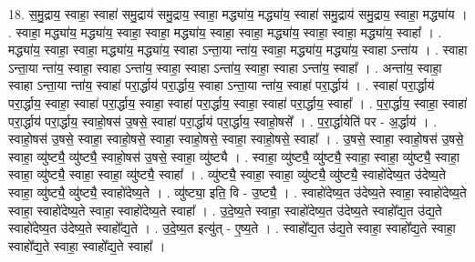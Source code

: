 \documentclass[17pt]{extarticle}
\begin{document}
18. स॒मु॒द्राय॒ स्वाहा॒ स्वाहा॑ समु॒द्राय॑ समु॒द्राय॒ स्वाहा॒ मद्ध्या॑य॒ मद्ध्या॑य॒ स्वाहा॑ समु॒द्राय॑ समु॒द्राय॒ स्वाहा॒ मद्ध्या॑य । . स्वाहा॒ मद्ध्या॑य॒ मद्ध्या॑य॒ स्वाहा॒ स्वाहा॒ मद्ध्या॑य॒ स्वाहा॒ स्वाहा॒ मद्ध्या॑य॒ स्वाहा॒ स्वाहा॒ मद्ध्या॑य॒ स्वाहा᳚ । . मद्ध्या॑य॒ स्वाहा॒ स्वाहा॒ मद्ध्या॑य॒ मद्ध्या॑य॒ स्वाहा ऽन्ता॒या न्ता॑य॒ स्वाहा॒ मद्ध्या॑य॒ मद्ध्या॑य॒ स्वाहा ऽन्ता॑य । . स्वाहा ऽन्ता॒या न्ता॑य॒ स्वाहा॒ स्वाहा ऽन्ता॑य॒ स्वाहा॒ स्वाहा ऽन्ता॑य॒ स्वाहा॒ स्वाहा ऽन्ता॑य॒ स्वाहा᳚ । . अन्ता॑य॒ स्वाहा॒ स्वाहा ऽन्ता॒या न्ता॑य॒ स्वाहा॑ परा॒र्द्धाय॑ परा॒र्द्धाय॒ स्वाहा ऽन्ता॒या न्ता॑य॒ स्वाहा॑ परा॒र्द्धाय॑ । . स्वाहा॑ परा॒र्द्धाय॑ परा॒र्द्धाय॒ स्वाहा॒ स्वाहा॑ परा॒र्द्धाय॒ स्वाहा॒ स्वाहा॑ परा॒र्द्धाय॒ स्वाहा॒ स्वाहा॑ परा॒र्द्धाय॒ स्वाहा᳚ । . प॒रा॒र्द्धाय॒ स्वाहा॒ स्वाहा॑ परा॒र्द्धाय॑ परा॒र्द्धाय॒ स्वाहो॒षस॑ उ॒षसे॒ स्वाहा॑ परा॒र्द्धाय॑ परा॒र्द्धाय॒ स्वाहो॒षसे᳚ । . प॒रा॒र्द्धायेति॑ पर - अ॒र्द्धाय॑ । . स्वाहो॒षस॑ उ॒षसे॒ स्वाहा॒ स्वाहो॒षसे॒ स्वाहा॒ स्वाहो॒षसे॒ स्वाहा॒ स्वाहो॒षसे॒ स्वाहा᳚ । . उ॒षसे॒ स्वाहा॒ स्वाहो॒षस॑ उ॒षसे॒ स्वाहा॒ व्यु॑ष्ट्यै॒ व्यु॑ष्ट्यै॒ स्वाहो॒षस॑ उ॒षसे॒ स्वाहा॒ व्यु॑ष्ट्यै । . स्वाहा॒ व्यु॑ष्ट्यै॒ व्यु॑ष्ट्यै॒ स्वाहा॒ स्वाहा॒ व्यु॑ष्ट्यै॒ स्वाहा॒ स्वाहा॒ व्यु॑ष्ट्यै॒ स्वाहा॒ स्वाहा॒ व्यु॑ष्ट्यै॒ स्वाहा᳚ । . व्यु॑ष्ट्यै॒ स्वाहा॒ स्वाहा॒ व्यु॑ष्ट्यै॒ व्यु॑ष्ट्यै॒ स्वाहो॑देष्य॒त उ॑देष्य॒ते स्वाहा॒ व्यु॑ष्ट्यै॒ व्यु॑ष्ट्यै॒ स्वाहो॑देष्य॒ते । . व्यु॑ष्ट्या॒ इति॒ वि - उ॒ष्ट्यै॒ । . स्वाहो॑देष्य॒त उ॑देष्य॒ते स्वाहा॒ स्वाहो॑देष्य॒ते स्वाहा॒ स्वाहो॑देष्य॒ते स्वाहा॒ स्वाहो॑देष्य॒ते स्वाहा᳚ । . उ॒दे॒ष्य॒ते स्वाहा॒ स्वाहो॑देष्य॒त उ॑देष्य॒ते स्वाहो᳚द्य॒त उ॑द्य॒ते स्वाहो॑देष्य॒त उ॑देष्य॒ते स्वाहो᳚द्य॒ते । . उ॒दे॒ष्य॒त इत्यु॑त् - ए॒ष्य॒ते । . स्वाहो᳚द्य॒त उ॑द्य॒ते स्वाहा॒ स्वाहो᳚द्य॒ते स्वाहा॒ स्वाहो᳚द्य॒ते स्वाहा॒ स्वाहो᳚द्य॒ते स्वाहा᳚ । \newline
\end{document}
